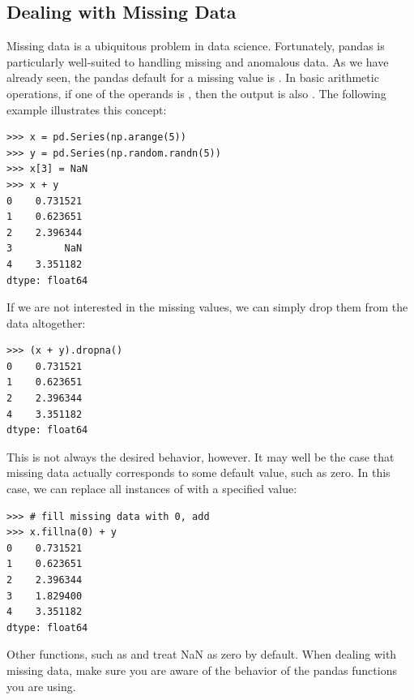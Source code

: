 \subsection*{Dealing with Missing Data}
Missing data is a ubiquitous problem in data science. Fortunately, pandas is particularly well-suited to 
handling missing and anomalous data. As we have already seen, the pandas default for a missing value is . 
In basic arithmetic operations, if one of the operands is , then the output is also .
The following example illustrates this concept:
\begin{lstlisting}
>>> x = pd.Series(np.arange(5))
>>> y = pd.Series(np.random.randn(5))
>>> x[3] = NaN
>>> x + y
0    0.731521
1    0.623651
2    2.396344
3         NaN
4    3.351182
dtype: float64
\end{lstlisting}
If we are not interested in the missing values, we can simply drop them from the data altogether:
\begin{lstlisting}
>>> (x + y).dropna()
0    0.731521
1    0.623651
2    2.396344
4    3.351182
dtype: float64
\end{lstlisting}

This is not always the desired behavior, however. It may well be the case that missing data actually corresponds to
some default value, such as zero. In this case, we can replace all instances of  with a specified value:
\begin{lstlisting}
>>> # fill missing data with 0, add
>>> x.fillna(0) + y
0    0.731521
1    0.623651
2    2.396344
3    1.829400
4    3.351182
dtype: float64
\end{lstlisting}

Other functions, such as  and  treat NaN as zero by default.
When dealing with missing data, make sure you are aware of the behavior of the pandas
functions you are using.

